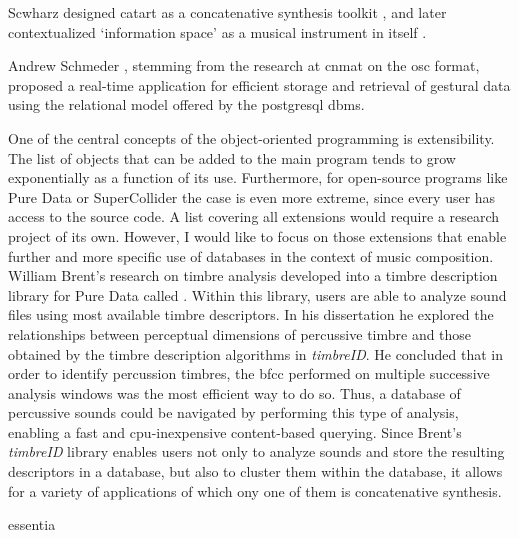 {	Scwharz designed \gls{catart} as a concatenative synthesis toolkit \parencite{Sch06:Rea}, and later contextualized `information space' as a musical instrument in itself \parencite{diemo_schwarz_2009_849679, Schwarz:2012}.

	Andrew Schmeder \parencite{icmc/bbp2372.2009.005}, stemming from the research at \gls{cnmat} on the \gls{osc} format, proposed a real-time application for efficient storage and retrieval of gestural data using the relational model offered by the \gls{postgresql} \gls{dbms}. 

	One of the central concepts of the object-oriented programming is extensibility. The list of objects that can be added to the main program tends to grow exponentially as a function of its use. Furthermore, for open-source programs like Pure Data or SuperCollider the case is even more extreme, since every user has access to the source code. A list covering all extensions would require a research project of its own. However, I would like to focus on those extensions that enable further and more specific use of databases in the context of music composition. William Brent's research on timbre analysis \parencite{Brent/2010/phdthesis} developed into a timbre description library for Pure Data called \parencite{icmc/bbp2372.2010.044}. Within this library, users are able to analyze sound files using most available timbre descriptors. In his dissertation he explored the relationships between perceptual dimensions of percussive timbre and those obtained by the timbre description algorithms in \textit{timbreID}. He concluded that in order to identify percussion timbres, the \gls{bfcc} performed on multiple successive analysis windows was the most efficient way to do so. Thus, a database of percussive sounds could be navigated by performing this type of analysis, enabling a fast and \gls{cpu}-inexpensive content-based querying. Since Brent's \textit{timbreID} library enables users not only to analyze sounds and store the resulting descriptors in a database, but also to cluster them within the database, it allows for a variety of applications of which ony one of them is concatenative synthesis.

	\gls{essentia} \parencite{DBLP:conf/ismir/BogdanovWGGHMRSZS13}
}
